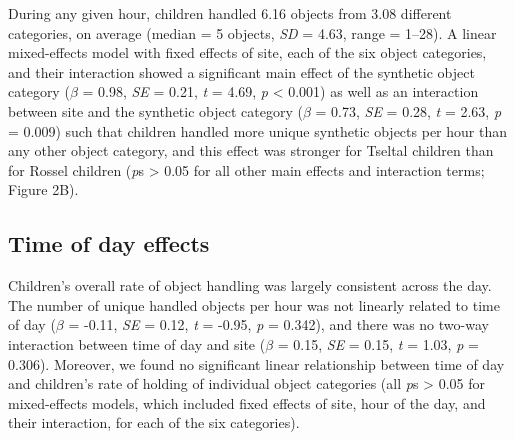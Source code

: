 \documentclass[10pt, letterpaper]{article}
\begin{document}
During any given hour, children handled 6.16 objects from 3.08 different
categories, on average (median = 5 objects, \emph{SD} = 4.63, range =
1--28). A linear mixed-effects model with fixed effects of site, each of
the six object categories, and their interaction showed a significant
main effect of the synthetic object category (\(\beta\) = 0.98,
\emph{SE} = 0.21, \emph{t} = 4.69, \emph{p} \textless{} 0.001) as well
as an interaction between site and the synthetic object category
(\(\beta\) = 0.73, \emph{SE} = 0.28, \emph{t} = 2.63, \emph{p} = 0.009)
such that children handled more unique synthetic objects per hour than
any other object category, and this effect was stronger for Tseltal
children than for Rossel children (\emph{p}s \textgreater{} 0.05 for all
other main effects and interaction terms; Figure 2B).

\hypertarget{time-of-day-effects}{%
\subsection{Time of day effects}\label{time-of-day-effects}}

Children's overall rate of object handling was largely consistent across
the day. The number of unique handled objects per hour was not linearly
related to time of day (\(\beta\) = -0.11, \emph{SE} = 0.12, \emph{t} =
-0.95, \emph{p} = 0.342), and there was no two-way interaction between
time of day and site (\(\beta\) = 0.15, \emph{SE} = 0.15, \emph{t} =
1.03, \emph{p} = 0.306). Moreover, we found no significant linear
relationship between time of day and children's rate of holding of
individual object categories (all \emph{p}s \textgreater{} 0.05 for
mixed-effects models, which included fixed effects of site, hour of the
day, and their interaction, for each of the six categories).
\end{document}
